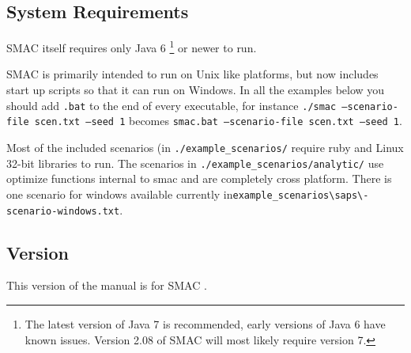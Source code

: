 \documentclass[manual.tex]{subfiles}
\begin{document}
\subsection{System Requirements}

SMAC itself requires only Java 6 \footnote{The latest version of Java 7 is recommended, early versions of Java 6 have known issues. Version 2.08 of SMAC will most likely require version 7.} or newer to run. 

SMAC is primarily intended to run on Unix like platforms, but now includes start up scripts so that it can run on Windows. In all the examples below you should add \texttt{.bat} to the end of every executable, for instance \texttt{./smac --scenario-file scen.txt --seed 1} becomes \texttt{smac.bat --scenario-file scen.txt --seed 1}.

Most of the included scenarios (in \texttt{./example\_scenarios/} require ruby and Linux 32-bit libraries to run. The scenarios in \texttt{./example\_scenarios/analytic/} use optimize functions internal to smac and are completely cross platform. There is one scenario for windows available currently in\texttt{example\_scenarios\textbackslash saps\textbackslash\saps-scenario-windows.txt}.


\subsection{Version}
This version of the manual is for SMAC $\!\!$.
\\




\end{document}
